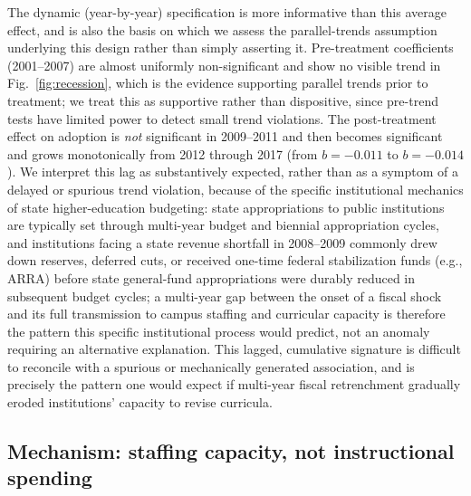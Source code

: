 \documentclass[11pt, letterpaper]{article}
\begin{document}
The dynamic (year-by-year) specification is more informative than this average effect, and is also the basis on which we assess the parallel-trends assumption underlying this design rather than simply asserting it. Pre-treatment coefficients (2001--2007) are almost uniformly non-significant and show no visible trend in Fig.~\ref{fig:recession}, which is the evidence supporting parallel trends prior to treatment; we treat this as supportive rather than dispositive, since pre-trend tests have limited power to detect small trend violations. The post-treatment effect on adoption is \emph{not} significant in 2009--2011 and then becomes significant and grows monotonically from 2012 through 2017 (from $b=-0.011$ to $b=-0.014$). We interpret this lag as substantively expected, rather than as a symptom of a delayed or spurious trend violation, because of the specific institutional mechanics of state higher-education budgeting: state appropriations to public institutions are typically set through multi-year budget and biennial appropriation cycles, and institutions facing a state revenue shortfall in 2008--2009 commonly drew down reserves, deferred cuts, or received one-time federal stabilization funds (e.g., ARRA) before state general-fund appropriations were durably reduced in subsequent budget cycles; a multi-year gap between the onset of a fiscal shock and its full transmission to campus staffing and curricular capacity is therefore the pattern this specific institutional process would predict, not an anomaly requiring an alternative explanation. This lagged, cumulative signature is difficult to reconcile with a spurious or mechanically generated association, and is precisely the pattern one would expect if multi-year fiscal retrenchment gradually eroded institutions' capacity to revise curricula.

\subsection*{Mechanism: staffing capacity, not instructional spending}

\begin{table}[H]
\centering
\caption{Effect of pre-recession state-appropriation dependence interacted with a post-2009 indicator on log total instructional staff headcount, 2002--2017. Standard errors clustered by institution in parentheses.}
\label{tab:main3}

\end{table}
\end{document}
